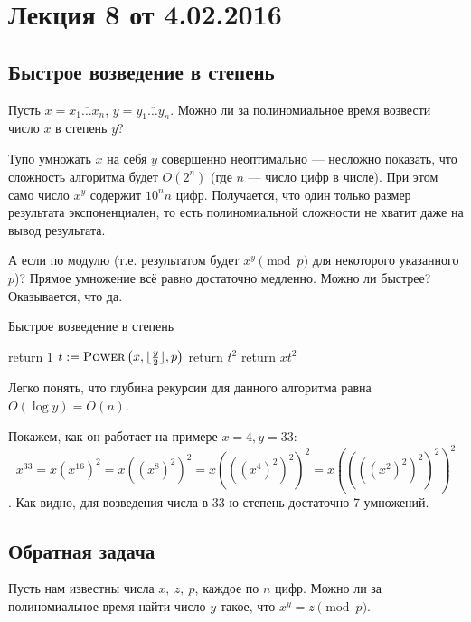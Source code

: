 
\let\epsilent\varepsilon


\section*{Лекция 8 от 4.02.2016}

\subsection{Быстрое возведение в степень}
Пусть \(x = \overline{x_1 \ldots x_n}\), \(y = \overline{y_1 \ldots y_n}\). Можно ли за полиномиальное время возвести число $x$ в степень $y$?

Тупо умножать $x$ на себя $y$ совершенно неоптимально --- несложно показать, что сложность алгоритма будет $O(2^n)$ (где $n$ --- число цифр в числе). При этом само число $x^y$ содержит \(10^{n}n\) цифр. Получается, что один только размер результата экспоненциален, то есть полиномиальной сложности не хватит даже на вывод результата.

А если по модулю (т.е. результатом будет \(x^y \pmod{p}\) для некоторого указанного \(p\))? Прямое умножение всё равно достаточно медленно. Можно ли быстрее? Оказывается, что да.

\begin{algorithm}
	\caption{Быстрое возведение в степень}
	\begin{algorithmic}[1]
			\State return 1
		\EndIf
		\State \(t \mathrel{:=} \textsc{Power}\left(x, \lfloor\frac{y}{2}\rfloor, p \right)\)
			\State return \(t^2\)
		\Else
			\State return \(xt^2\)
		\EndIf
		\EndFunction
	\end{algorithmic}
\end{algorithm}

Легко понять, что глубина рекурсии для данного алгоритма равна $O(\log y) = O(n)$.

Покажем, как он работает на примере \(x = 4, y = 33\): \[x^{33} = x(x^{16})^{2} = x((x^{8})^2)^2 = x(((x^4)^2)^2)^2 = x((((x^2)^2)^2)^2)^2 \].
Как видно, для возведения числа в 33-ю степень достаточно 7 умножений.

\subsection{Обратная задача}

Пусть нам известны числа $x,\ z,\ p$, каждое по $n$ цифр. Можно ли за полиномиальное время найти число $y$ такое, что $x^y = z \pmod{p}$.

